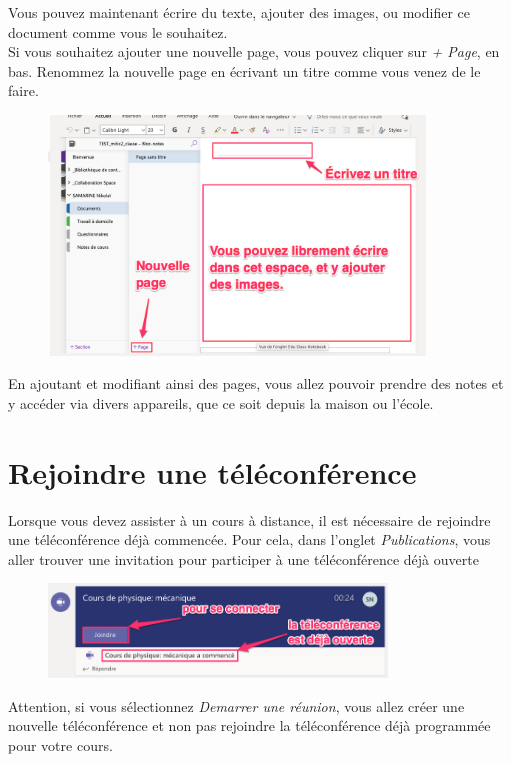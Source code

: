 Vous pouvez maintenant écrire du texte, ajouter des images, ou modifier ce document comme vous le souhaitez.\\

Si vous souhaitez ajouter une nouvelle page, vous pouvez cliquer sur \textit{+ Page}, en bas. Renommez la nouvelle page en écrivant un titre comme vous venez de le faire.

\begin{figure}[H]
	\includegraphics[width=10cm]{./images/teams/sous_section_documents_crop}
	\centering
\end{figure}

En ajoutant et modifiant ainsi des pages, vous allez pouvoir prendre des notes et y accéder via divers appareils, que ce soit depuis la maison ou l'école.

\section{Rejoindre une téléconférence}

Lorsque vous devez assister à un cours à distance, il est nécessaire de rejoindre une téléconférence déjà commencée. Pour cela, dans l'onglet \textit{Publications}, vous aller trouver une invitation pour participer à une téléconférence déjà ouverte

\begin{figure}[H]
\includegraphics[width=9cm]{./images/teams/video1}
\centering
\end{figure}

Attention, si vous sélectionnez \textit{Demarrer une réunion}, vous allez créer une nouvelle téléconférence et non pas rejoindre la téléconférence déjà programmée pour votre cours.


